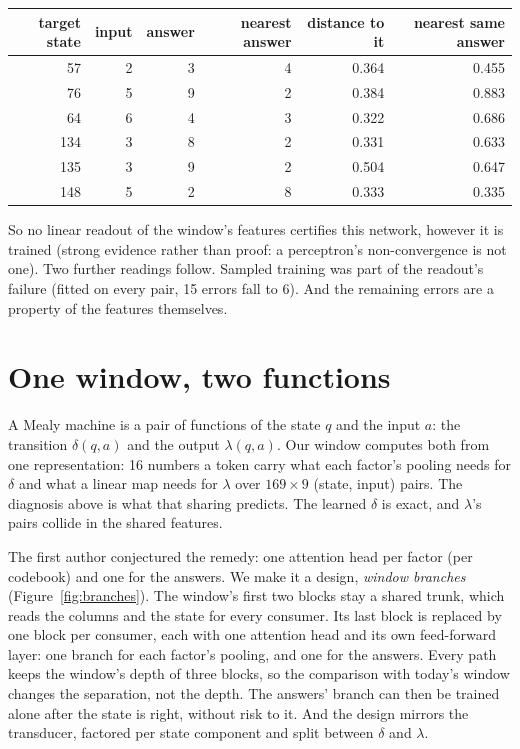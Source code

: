 \documentclass[11pt]{article}
\begin{document}
\begin{center}
\begin{tabular}{rrrrrr}
\toprule
target state & input & answer & nearest answer & distance to it & nearest same answer \\
\midrule
57 & 2 & 3 & 4 & 0.364 & 0.455 \\
76 & 5 & 9 & 2 & 0.384 & 0.883 \\
64 & 6 & 4 & 3 & 0.322 & 0.686 \\
134 & 3 & 8 & 2 & 0.331 & 0.633 \\
135 & 3 & 9 & 2 & 0.504 & 0.647 \\
148 & 5 & 2 & 8 & 0.333 & 0.335 \\
\bottomrule
\end{tabular}
\end{center}

So no linear readout of the window's features certifies this network, however it is trained (strong
evidence rather than proof: a perceptron's non-convergence is not one). Two further readings
follow. Sampled training was part of the readout's failure (fitted on every pair, 15 errors fall to
6). And the remaining errors are a property of the features themselves.

\section{One window, two functions}
\label{sec:design}

A Mealy machine is a pair of functions of the state $q$ and the input $a$: the transition
$\delta(q, a)$ and the output $\lambda(q, a)$. Our window computes both from one representation:
16 numbers a token carry what each factor's pooling needs for $\delta$ and what a linear map needs
for $\lambda$ over $169 \times 9$ (state, input) pairs. The diagnosis above is what that sharing
predicts. The learned $\delta$ is exact, and $\lambda$'s pairs collide in the shared features.

The first author conjectured the remedy: one attention head per factor (per codebook) and one for
the answers. We make it a design, \emph{window branches} (Figure~\ref{fig:branches}). The window's
first two blocks stay a shared trunk, which reads the columns and the state for every consumer.
Its last block is replaced by one block per consumer, each with one attention head and its own
feed-forward layer: one branch for each factor's pooling, and one for the answers. Every path keeps
the window's depth of three blocks, so the comparison with today's window changes the separation,
not the depth. The answers' branch can then be trained alone after the state is right, without
risk to it. And the design mirrors the transducer, factored per state component and split between
$\delta$ and $\lambda$.
\end{document}
